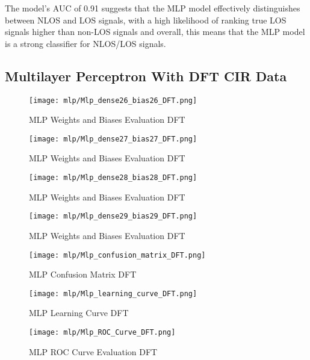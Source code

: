 The model's AUC of 0.91 suggests that the MLP model effectively distinguishes between NLOS and LOS signals, with a high likelihood of ranking true LOS signals higher than non-LOS signals and overall, this means that the MLP model is a strong classifier for NLOS/LOS signals.
\subsection{Multilayer Perceptron With DFT CIR Data}\label{mlp_visual_dft}

\begin{figure}[H] 
  \centering
  \texttt{[image: mlp/Mlp\_dense26\_bias26\_DFT.png]}
  \caption{MLP Weights and Biases Evaluation DFT}\label{fig:Mlp_dense26_bias26_DFT}
\end{figure}

\begin{figure}[H] 
  \centering
  \texttt{[image: mlp/Mlp\_dense27\_bias27\_DFT.png]}
  \caption{MLP Weights and Biases Evaluation DFT}\label{fig:Mlp_dense27_bias27_DFTMlp_dense27_bias27_DFT}
\end{figure}

\begin{figure}[H] 
  \centering
  \texttt{[image: mlp/Mlp\_dense28\_bias28\_DFT.png]}
  \caption{MLP Weights and Biases Evaluation DFT}\label{fig:Mlp_dense28_bias28_DFT}
\end{figure}

\begin{figure}[H] 
  \centering
  \texttt{[image: mlp/Mlp\_dense29\_bias29\_DFT.png]}
  \caption{MLP Weights and Biases Evaluation DFT}\label{fig:Mlp_dense29_bias29_DFT}
\end{figure}


\begin{figure}[H] 
  \centering
  \texttt{[image: mlp/Mlp\_confusion\_matrix\_DFT.png]}
  \caption{MLP Confusion Matrix DFT}\label{fig:Mlp_confusion_matrix_DFT}
\end{figure}


\begin{figure}[H] 
  \centering
  \texttt{[image: mlp/Mlp\_learning\_curve\_DFT.png]}
  \caption{MLP Learning Curve DFT}\label{fig:Mlp_learning_curve_DFT}
\end{figure}


\begin{figure}[H] 
  \centering
  \texttt{[image: mlp/Mlp\_ROC\_Curve\_DFT.png]}
  \caption{MLP ROC Curve Evaluation DFT}\label{fig:Mlp_ROC_Curve_DFT}
\end{figure}

